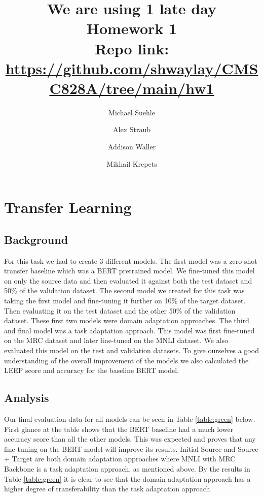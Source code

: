\documentclass[10pt]{article}
\title{We are using 1 late day \\ Homework 1 \\ Repo link: \href{https://github.com/shwaylay/CMSC828A/tree/main/hw1}{https://github.com/shwaylay/CMSC828A/tree/main/hw1}}
\author{Michael Suehle \and Alex Straub \and Addison Waller \and Mikhail Krepets\\}
\begin{document}
\maketitle

%
% 

\section{Transfer Learning}

\subsection{Background}

For this task we had to create 3 different models. 
The first model was a zero-shot transfer baseline which was a 
BERT pretrained model. We fine-tuned this model on only the 
source data and then evaluated it against both the test
dataset and 50\% of the validation dataset. The second 
model we created for this task was taking the first model 
and fine-tuning it further on 10\% of the target dataset. 
Then evaluating it on the test dataset and the other 50\% 
of the validation dataset. These first two models were 
domain adaptation approaches. The third and final model 
was a task adaptation approach. This model was first 
fine-tuned on the MRC dataset and later fine-tuned on the
MNLI dataset. We also evaluated this model on the test and
validation datasets. To give ourselves a good understanding 
of the overall improvement of the models we also calculated 
the LEEP score and accuracy for the baseline BERT model. 

\subsection{Analysis}

Our final evaluation data for all models can be seen in Table 
\ref{table:green} below. First glance at the table shows that the BERT 
baseline had a much lower accuracy score than all the other 
models. This was expected and proves that any fine-tuning on 
the BERT model will improve its results. Initial Source and 
Source + Target are both domain adaptation approaches where 
MNLI with MRC Backbone is a task adaptation approach, as 
mentioned above. By the results in Table \ref{table:green} it is clear to 
see that the domain adaptation approach has a higher degree 
of transferability than the task adaptation approach. 
\end{document}

